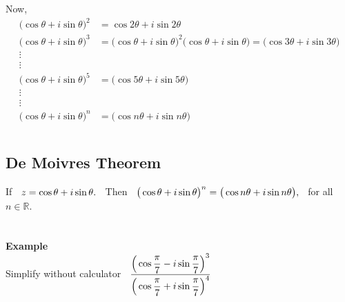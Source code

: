 \documentclass[11pt,a4paper]{article}
\begin{document}
Now,
\begin{align*}
\big(\cos \theta + i \sin \theta\big)^2 & = \cos 2 \theta + i \sin 2\theta\\
\big(\cos \theta + i \sin \theta\big)^3 & = \big(\cos \theta + i \sin \theta\big)^2\big(\cos \theta + i \sin \theta\big)= \big(\cos 3 \theta + i \sin 3\theta\big)\\
\vdots & \\
\vdots & \\
\big(\cos \theta + i \sin \theta\big)^5 & = \big(\cos 5\theta + i \sin 5\theta\big)\\
\vdots\\
\vdots\\
\big(\cos \theta + i \sin \theta\big)^n & = \big(\cos n\theta + i \sin n\theta\big)\\\\
\end{align*}









\subsection{De Moivres Theorem}
If $\hspace{0.2cm} z = \cos \theta + i\sin \theta.\hspace{0.2cm}$ Then $\hspace{0.2cm}\displaystyle{\big(\cos \theta + i \sin \theta\big)^n  = \big(\cos n\theta + i \sin n\theta\big)},\hspace{0.2cm}$ for all $n \in \mathbb{R}$.\\\\\\




\textbf{Example}\\
Simplify without calculator $\hspace{0.2cm}\displaystyle{\dfrac{\Big(\cos \dfrac{\pi}{7} - i\sin \dfrac{\pi}{7}\Big)^3}{\Big(\cos \dfrac{\pi}{7}+ i\sin \dfrac{\pi}{7}\Big)^4}}$\\
\end{document}
